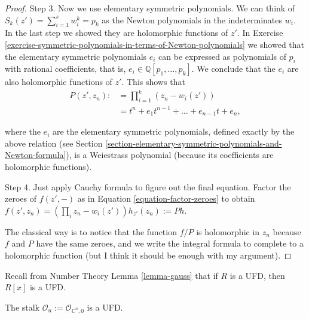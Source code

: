 \begin{proof}
\medskip\noindent
Step 3. Now we use elementary symmetric polynomials.
We can think of
$S_k(z')=\sum_{i=1}^sw_i^k=p_k$ as the Newton polynomials in the
indeterminates $w_i$.
In the last step we showed they are holomorphic functions
of $z'$. 
In Exercise \ref{exercise-symmetric-polynomials-in-terms-of-Newton-polynomials}
we showed that the elementary symmetric polynomials $e_i$ can be expressed 
as polynomials of $p_i$ with rational coefficients,
that is, $e_i\in\mathbb{Q}[p_1,\ldots,p_k]$.
We conclude that the $e_i$ are also holomorphic functions of $z'$. 
This shows that
\begin{align*}
P(z',z_n):&=\prod_{i=1}^k(z_n-w_i(z'))\\
&=t^n+e_1t^{n-1}+\ldots+e_{n-1}t+e_n,
\end{align*}

\noindent
where the $e_i$ are the elementary symmetric polynomials,
defined exactly by the above relation (see Section
\ref{section-elementary-symmetric-polynomials-and-Newton-formula}),
is a Weiestrass polynomial 
(because its coefficients are holomorphic functions).

\medskip\noindent
Step 4. Just apply Cauchy formula to figure out
the final equation. 
Factor the zeroes of $f(z',-)$ as in  Equation \ref{equation-factor-zeroes}
to obtain
$f(z',z_n)=\left(\prod_{i}z_n-w_i(z')\right)h_{z'}(z_n):=Ph$.

The classical way is to notice that the function $f/P$ is holomorphic in $z_n$
because $f$ and $P$ have the same zeroes, and we write the integral formula to
complete to a holomorphic function (but I think it should be enough with my
argument).
\end{proof}

\noindent
Recall from Number Theory Lemma \ref{lemma-gauss}
that if $R$ is a UFD, then $R[x]$ is a UFD.

\begin{lemma}
\label{lemma-stalk-is-UFD}
The stalk $\mathcal{O}_n:=\mathcal{O}_{\mathbb{C}^n,0}$ is a UFD.
\end{lemma}

